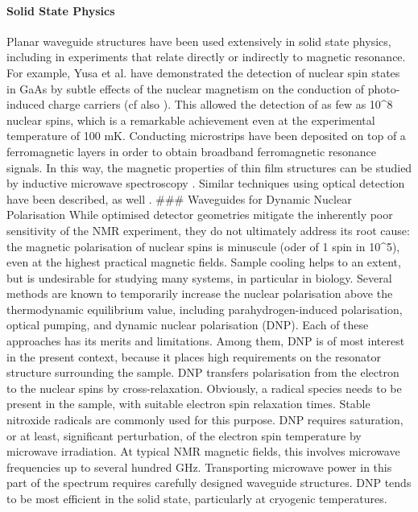 \paragraph{Solid State Physics}
Planar
waveguide structures have been used extensively in solid state physics,
including in experiments that relate directly or indirectly to magnetic
resonance. For example, Yusa et al. have demonstrated the detection of
nuclear spin states in GaAs by subtle effects of the nuclear magnetism
on the conduction of photo-induced charge carriers \cite{Yusa:2005iy} (cf
also \cite{Tycko:2005kj}). This allowed the detection of as few as 10\^{}8
nuclear spins, which is a remarkable achievement even at the
experimental temperature of 100 mK. Conducting microstrips have been
deposited on top of a ferromagnetic layers in order to obtain broadband
ferromagnetic resonance signals. In this way, the magnetic properties of
thin film structures can be studied by inductive microwave spectroscopy
\cite{Kostylev:2009ia,Kostylev:2010fy}. Similar techniques using optical
detection have been described, as well \cite{Keatley:2005by}. \#\#\#
Waveguides for Dynamic Nuclear Polarisation While optimised detector
geometries mitigate the inherently poor sensitivity of the NMR
experiment, they do not ultimately address its root cause: the magnetic
polarisation of nuclear spins is minuscule (oder of 1 spin in 10\^{}5),
even at the highest practical magnetic fields. Sample cooling helps to
an extent, but is undesirable for studying many systems, in particular
in biology. Several methods are known to temporarily increase the
nuclear polarisation above the thermodynamic equilibrium value,
including parahydrogen-induced polarisation, optical pumping, and
dynamic nuclear polarisation (DNP). Each of these approaches has its
merits and limitations. Among them, DNP is of most interest in the
present context, because it places high requirements on the resonator
structure surrounding the sample. DNP transfers polarisation from the
electron to the nuclear spins by cross-relaxation. Obviously, a radical
species needs to be present in the sample, with suitable electron spin
relaxation times. Stable nitroxide radicals are commonly used for this
purpose. DNP requires saturation, or at least, significant perturbation,
of the electron spin temperature by microwave irradiation. At typical
NMR magnetic fields, this involves microwave frequencies up to several
hundred GHz. Transporting microwave power in this part of the spectrum
requires carefully designed waveguide structures. DNP tends to be most
efficient in the solid state, particularly at cryogenic temperatures.
